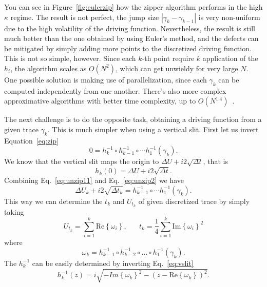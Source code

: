 You can see in Figure~\ref{fig:eulerzip} how the zipper algorithm performs in
the high $\kappa$ regime. The result is not perfect, the jump size
$\left|\gamma_{k}-\gamma_{k-1}\right|$ is very non-uniform due to the high
volatility of the driving function. Nevertheless, the result is still much
better than the one obtained by using Euler's method, and the defects can be
mitigated by simply adding more points to the discretized driving function.
This is not so simple, however. Since each $k$-th point require $k$ application
of the $h_i$, the algorithm scales as $O(N^2)$, which can get unwieldy for very
large $N$. One possible solution is making use of parallelization, since each
$\gamma_k$ can be computed independently from one another. There's also more
complex approximative algorithms with better time complexity, up to
$O(N^{1.4})$~\cite{Kennedy2007}.

The next challenge is to do the opposite task, obtaining a driving function
from a given trace $\gamma_k$. This is much simpler when using a vertical slit.
First let us invert Equation~\ref{eq:zip}
\begin{equation}
    \label{eq:unzip11}
    0=h_{k}^{-1}\circ h_{k-1}^{-1}\circ\cdots h_{1}^{-1}\left(\gamma_{k}\right).
\end{equation}
We know that the vertical slit maps the origin to $\Delta U+i2\sqrt{\Delta t}$,
that is
\begin{equation}
    \label{eq:unzip2}
    h_{k}\left(0\right)=\Delta U+i2\sqrt{\Delta t}.
\end{equation}
Combining Eq.~\ref{eq:unzip11} and Eq.~\ref{eq:unzip2} we have    
\begin{equation}
    \Delta U_{k}+i2\sqrt{\Delta t_{k}}=
    h_{k-1}^{-1}\circ\cdots h_{1}^{-1}\left(\gamma_{k}\right).
\end{equation}
This way we can determine the $t_k$ and $U_{t_k}$ of given discretized
trace by simply taking
\begin{equation}
    \label{eq:unzip1}
    U_{t_k}=\sum_{i=1}^{k}\mbox{Re}\left\{ \omega_{i}\right\},
    \,\,\,\,\,\,\,\,\,\,
    t_{k}=\frac{1}{4}\sum_{i=1}^{k}\mbox{Im}\left\{ \omega_{i}\right\} ^{2}
\end{equation}
where
\begin{equation}
    \omega_{k}=h_{k-1}^{-1}\circ h_{k-2}^{-1}\circ
        \ldots\circ h_{1}^{-1}\left(\gamma_{k}\right).
\end{equation}
The $h_k^{-1}$ can be easily determined by inverting Eq.~\ref{eq:vslit}
\begin{equation}
    h_{k}^{-1}\left(z\right)=
    i\sqrt{-Im{\left\{ \omega_{k}\right\}}^{2}
           -{\left(z-\mbox{Re}\left\{ \omega_{k}\right\} \right)}^{2}}.
\end{equation}

